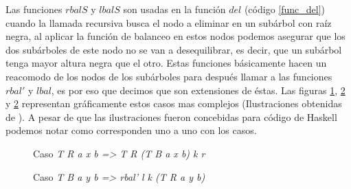 Las funciones \hyperref[lbalS]{$rbalS$} y \hyperref[lbalS]{$lbalS$} son usadas en la funci\'on 
\hyperref[func_del]{$del$} (c\'odigo \ref{func_del}) cuando la llamada recursiva busca el nodo a 
eliminar en un sub\'arbol con ra\'iz negra, al aplicar la funci\'on de balanceo en estos nodos 
podemos asegurar que los dos subárboles de este nodo no se van a desequilibrar, es decir, que un 
subárbol tenga mayor altura negra que el otro. Estas funciones b\'asicamente hacen un reacomodo de 
los nodos de los sub\'arboles para despu\'es llamar a las funciones \hyperref[rbal_2]{$rbal'$} y 
\hyperref[func_balanceo]{$lbal$}, es por eso que decimos que son extensiones de \'estas. Las figuras \ref{balanceo_grafico_del_1}, \ref{balanceo_grafico_del_2} y \ref{balanceo_grafico_del_2} representan gr\'aficamente estos casos mas complejos (Ilustraciones obtenidas de \cite{tesisG}). 
A pesar de que las ilustraciones fueron concebidas para c\'odigo de Haskell podemos notar como corresponden uno a uno con los casos.

\begin{figure}[!ht]
\centering
\captionsetup{justification=centering}
\caption{Caso \textit{T R a x b => T R (T B a x b) k r}}
\label{balanceo_grafico_del_1}
\end{figure}

\begin{figure}[!ht]
\centering
\captionsetup{justification=centering}
\caption{Caso \textit{T B a y b => rbal' l k (T R a y b)}}
\label{balanceo_grafico_del_2}
\end{figure}

